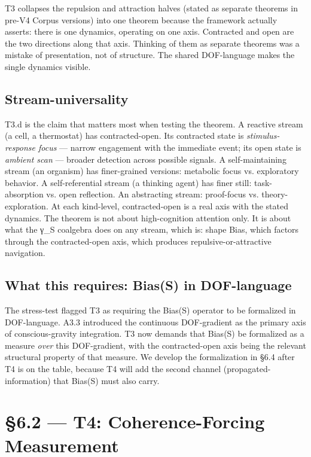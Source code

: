 \documentclass[11pt, openany]{book}
\newcommand{\sectionbreak}{\clearpage}
\begin{document}
T3 collapses the repulsion and attraction halves (stated as separate theorems in pre-V4 Corpus versions) into one theorem because the framework actually asserts: there is one dynamics, operating on one axis. Contracted and open are the two directions along that axis. Thinking of them as separate theorems was a mistake of presentation, not of structure. The shared DOF-language makes the single dynamics visible.

\subsection{Stream-universality}

T3.d is the claim that matters most when testing the theorem. A reactive stream (a cell, a thermostat) has contracted-open. Its contracted state is \textit{stimulus-response focus} --- narrow engagement with the immediate event; its open state is \textit{ambient scan} --- broader detection across possible signals. A self-maintaining stream (an organism) has finer-grained versions: metabolic focus vs. exploratory behavior. A self-referential stream (a thinking agent) has finer still: task-absorption vs. open reflection. An abstracting stream: proof-focus vs. theory-exploration. At each kind-level, contracted-open is a real axis with the stated dynamics. The theorem is not about high-cognition attention only. It is about what the γ\_\allowbreak{}S coalgebra does on any stream, which is: shape Bias, which factors through the contracted-open axis, which produces repulsive-or-attractive navigation.

\subsection{What this requires: Bias(S) in DOF-language}

The stress-test flagged T3 as requiring the Bias(S) operator to be formalized in DOF-language. A3.3 introduced the continuous DOF-gradient as the primary axis of conscious-gravity integration. T3 now demands that Bias(S) be formalized as a measure \textit{over} this DOF-gradient, with the contracted-open axis being the relevant structural property of that measure. We develop the formalization in §6.4 after T4 is on the table, because T4 will add the second channel (propagated-information) that Bias(S) must also carry.

\sectionbreak

\section{§6.2 --- T4: Coherence-Forcing Measurement}
\end{document}
